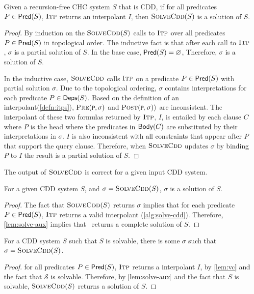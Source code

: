 \begin{lem}
  \label{lem:solve-aux}
  Given a recursion-free CHC system $S$ that is CDD, if for all
  predicates $P \in \mathsf{Pred}( S )$,
  $\textsc{Itp}$ returns
  an interpolant $I$, then $\textsc{SolveCdd}(S)$ is a solution of $S$.
\end{lem}
%
\begin{proof}
  By induction on the $\textsc{SolveCdd}(S)$ calls to $\textsc{Itp}$ over all
  predicates $P \in \mathsf{Pred}( S )$
  in topological order.
  The inductive fact is that after each call to $\textsc{Itp}$, $\sigma$
  is a partial solution of $S$.
  In the base case, $\mathsf{Pred}( S ) = \varnothing$,
  Therefore, $\sigma$ is a solution of $S$.

  In the inductive case, $\textsc{SolveCdd}$ calls $\textsc{Itp}$ on a predicate
  $P \in \mathsf{Pred}( S )$ with partial solution $\sigma$.  Due to the
  topological ordering, $\sigma$ contains interpretations for each
  predicate $P \in \mathsf{Deps}(S)$.
  Based on the definition of an interpolant(\autoref{defn:itps}),
  $\prectr(\cc{P},\sigma)$ and $\postctr(\cc{P},\sigma))$ are
  inconsistent.
  The interpolant of these two formulas returned by $\textsc{Itp}$, $I$,
  is entailed by each clause $C$ where $P$ is the head where the
  predicates in $\mathsf{Body}(C)$ are substituted by their interpretations
  in $\sigma$.
  $I$ is also inconsistent with all constraints that appear after $P$
  that support the query clause.
  Therefore, when $\textsc{SolveCdd}$ updates $\sigma$ by binding $P$ to $I$
  the result is a partial solution of $S$.
\end{proof}

The output of $\textsc{SolveCdd}$ is correct for a given input CDD system.
%
\begin{lem}
  \label{lem:cdd-soln-sound}
  For a given CDD system $S$, and $\sigma = \textsc{SolveCdd}(S)$, %
  $\sigma$ is a solution of $S$.
\end{lem}
%
\begin{proof}
  The fact that $\textsc{SolveCdd}(S)$ returns $\sigma$ implies that for each
  predicate $P \in \mathsf{Pred}( S )$,
  $\textsc{Itp}$ returns
  a valid interpolant (\autoref{alg:solve-cdd}).
  Therefore, \autoref{lem:solve-aux} implies that \solvecdd~returns a
  complete solution of $S$.
\end{proof}

\begin{lem}
  \label{lem:cdd-soln-complete}
  For a CDD system $S$ such that $S$ is
  solvable, %
  there is some $\sigma$ such that %
  $\sigma = \textsc{SolveCdd}(S)$.
\end{lem}
%
\begin{proof}
  for all predicates $P \in \mathsf{Pred}( S )$, $\textsc{Itp}$ returns a
  interpolant $I$, by
  \autoref{lem:vc} and the fact that $\mathcal{S}$ is solvable.
  Therefore, by \autoref{lem:solve-aux} and the fact that
  $S$ is solvable, $\textsc{SolveCdd}(S)$ returns a
  solution of $S$.
\end{proof}

